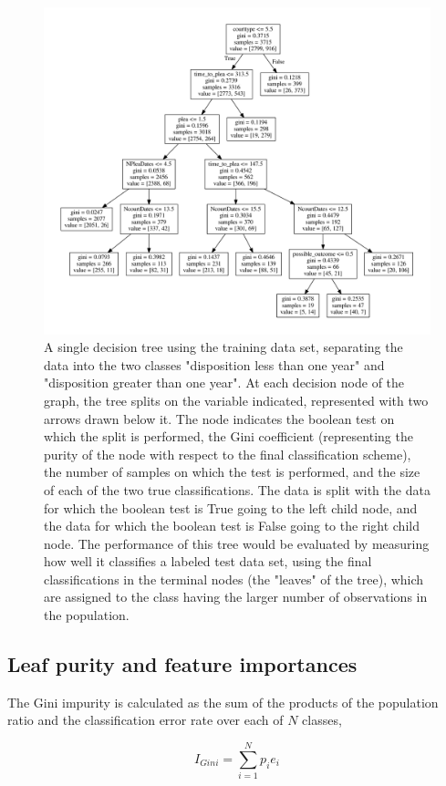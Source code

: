 \documentclass{AISB2008}
\begin{document}
\begin{figure}[h!]
\begin{center}
\includegraphics[width=0.70\columnwidth]{figures/simpleTree/simpleTree}
\caption{A single decision tree using the training data set, separating the data into the two classes "disposition less than one year" and "disposition greater than one year". At each decision node of the graph, the tree splits on the variable indicated, represented with two arrows drawn below it. The node indicates the boolean test on which the split is performed, the Gini coefficient (representing the purity of the node with respect to the final classification scheme), the number of samples on which the test is performed, and the size of each of the two true classifications. The data is split with the data for which the boolean test is True going to the left child node, and the data for which the boolean test is False going to the right child node. The performance of this tree would be evaluated by measuring how well it classifies a labeled test data set, using the final classifications in the terminal nodes (the "leaves" of the tree), which are assigned to the class having the larger number of observations in the population.
\label{fig:onetree}%
}
\end{center}
\end{figure}

\subsection{Leaf purity and feature importances}
The Gini impurity is calculated as the sum of the products of the population ratio and the classification error rate over each of $N$ classes,

$$I_{Gini} = \sum_{i=1}^{N}{p_i e_i}$$
\end{document}
